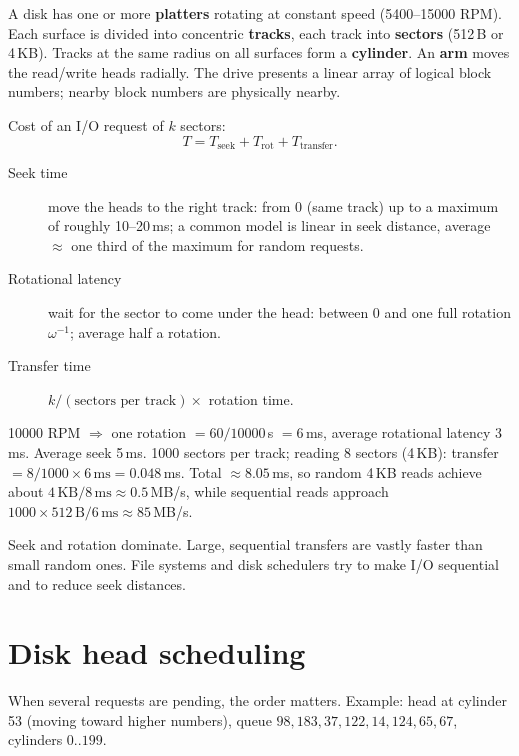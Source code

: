 A disk has one or more \textbf{platters} rotating at constant speed (5400--15000 RPM). Each
surface is divided into concentric \textbf{tracks}, each track into \textbf{sectors} (512\,B or
4\,KB). Tracks at the same radius on all surfaces form a \textbf{cylinder}. An \textbf{arm}
moves the read/write heads radially. The drive presents a linear array of logical block numbers;
nearby block numbers are physically nearby.

Cost of an I/O request of $k$ sectors:
\[
  T = T_{\text{seek}} + T_{\text{rot}} + T_{\text{transfer}}.
\]
\begin{description}
  \item[Seek time] move the heads to the right track: from 0 (same track) up to a maximum of
    roughly 10--20\,ms; a common model is linear in seek distance, average $\approx$ one third of
    the maximum for random requests.
  \item[Rotational latency] wait for the sector to come under the head: between 0 and one full
    rotation $\omega^{-1}$; average half a rotation.
  \item[Transfer time] $k/(\text{sectors per track}) \times$ rotation time.
\end{description}

\begin{example}
10000 RPM $\Rightarrow$ one rotation $= 60/10000$\,s $= 6$\,ms, average rotational latency
3\,ms. Average seek 5\,ms. 1000 sectors per track; reading 8 sectors (4\,KB): transfer
$= 8/1000 \times 6\,\text{ms} = 0.048$\,ms. Total $\approx 8.05$\,ms, so random 4\,KB reads
achieve about $4\,\text{KB}/8\,\text{ms} \approx 0.5$\,MB/s, while sequential reads approach
$1000 \times 512\,\text{B} / 6\,\text{ms} \approx 85$\,MB/s.
\end{example}

\begin{important}[Moral]
Seek and rotation dominate. Large, sequential transfers are vastly faster than small random ones.
File systems and disk schedulers try to make I/O sequential and to reduce seek distances.
\end{important}

\section{Disk head scheduling}

When several requests are pending, the order matters. Example: head at cylinder 53 (moving
toward higher numbers), queue $98, 183, 37, 122, 14, 124, 65, 67$, cylinders $0..199$.

